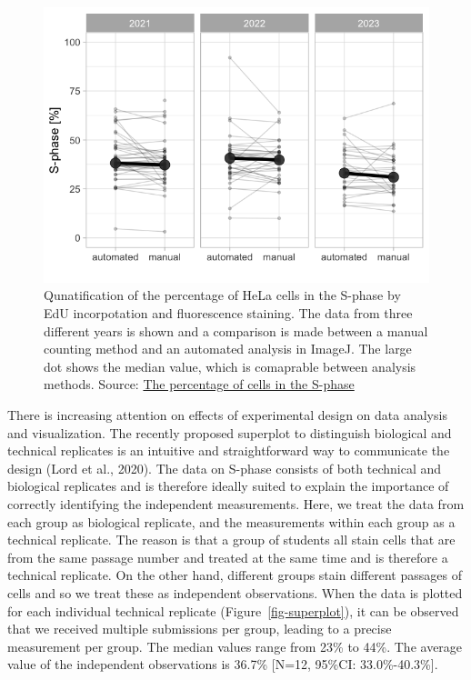 \documentclass[
]{agujournal2019}
\begin{document}
\begin{figure}[H]

{\centering \includegraphics{index_files/figure-latex/fig-paired-data-output-1.png}

}

\caption{\label{fig-paired-data}Qunatification of the percentage of HeLa
cells in the S-phase by EdU incorpotation and fluorescence staining. The
data from three different years is shown and a comparison is made
between a manual counting method and an automated analysis in ImageJ.
The large dot shows the median value, which is comaprable between
analysis methods. Source:
\href{https://JoachimGoedhart.github.io/MS-StudentSourcing/notebooks/PreciSe.qmd.html\#cell-fig-paired-data}{The
percentage of cells in the S-phase}}

\end{figure}

There is increasing attention on effects of experimental design on data
analysis and visualization. The recently proposed superplot to
distinguish biological and technical replicates is an intuitive and
straightforward way to communicate the design (Lord et al., 2020). The
data on S-phase consists of both technical and biological replicates and
is therefore ideally suited to explain the importance of correctly
identifying the independent measurements. Here, we treat the data from
each group as biological replicate, and the measurements within each
group as a technical replicate. The reason is that a group of students
all stain cells that are from the same passage number and treated at the
same time and is therefore a technical replicate. On the other hand,
different groups stain different passages of cells and so we treat these
as independent observations. When the data is plotted for each
individual technical replicate (Figure~\ref{fig-superplot}), it can be
observed that we received multiple submissions per group, leading to a
precise measurement per group. The median values range from 23\% to
44\%. The average value of the independent observations is 36.7\%
{[}N=12, 95\%CI: 33.0\%-40.3\%{]}.
\end{document}

